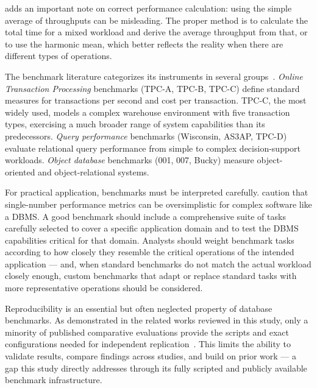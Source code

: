 \cite{Silberschatz2020} adds an important note on correct performance calculation: using
the simple average of throughputs can be misleading. The proper method is to calculate the
total time for a mixed workload and derive the average throughput from that, or to use the
harmonic mean, which better reflects the reality when there are different types of operations.

The benchmark literature categorizes its instruments in several groups~\cite{Ramakrishnan2003}.
\textit{Online Transaction Processing} benchmarks (TPC-A, TPC-B, TPC-C) define standard
measures for transactions per second and cost per transaction. TPC-C, the most widely used,
models a complex warehouse environment with five transaction types, exercising a much broader
range of system capabilities than its predecessors. \textit{Query performance} benchmarks
(Wisconsin, AS3AP, TPC-D) evaluate relational query performance from simple to complex
decision-support workloads. \textit{Object database} benchmarks (001, 007, Bucky) measure
object-oriented and object-relational systems.

For practical application, benchmarks must be interpreted carefully.
\cite{Ramakrishnan2003} caution that single-number performance metrics can be oversimplistic
for complex software like a DBMS. A good benchmark should include a comprehensive suite of
tasks carefully selected to cover a specific application domain and to test the DBMS capabilities
critical for that domain. Analysts should weight benchmark tasks according to how closely they
resemble the critical operations of the intended application --- and, when standard benchmarks
do not match the actual workload closely enough, custom benchmarks that adapt or replace
standard tasks with more representative operations should be considered.

Reproducibility is an essential but often neglected property of database benchmarks.
As demonstrated in the related works reviewed in this study, only a minority of published
comparative evaluations provide the scripts and exact configurations needed for independent
replication~\cite{pereira2023mulletbench}. This limits the ability to validate results,
compare findings across studies, and build on prior work --- a gap this study directly
addresses through its fully scripted and publicly available benchmark infrastructure.

